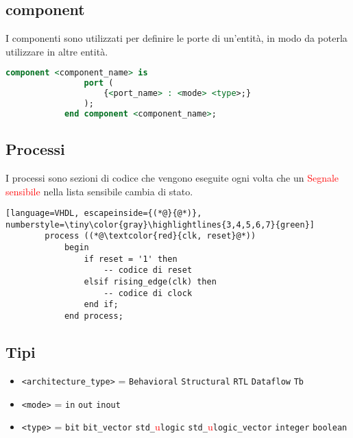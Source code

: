     \subsection{component}
        I componenti sono utilizzati per definire le porte di un'entità, in modo da poterla utilizzare in altre entità.
        \begin{lstlisting}[language=VHDL]
            component <component_name> is
                port (
                    {<port_name> : <mode> <type>;}
                );
            end component <component_name>;
        \end{lstlisting}


    \subsection{Processi}
        I processi sono sezioni di codice che vengono eseguite ogni volta che un \textcolor{red}{Segnale sensibile} nella lista sensibile cambia di stato.
        \begin{lstlisting}[language=VHDL, escapeinside={(*@}{@*)}, numberstyle=\tiny\color{gray}\highlightlines{3,4,5,6,7}{green}]
        process ((*@\textcolor{red}{clk, reset}@*))
            begin
                if reset = '1' then
                    -- codice di reset
                elsif rising_edge(clk) then
                    -- codice di clock
                end if;
            end process;
        \end{lstlisting}


    \subsection{Tipi}
        \begin{itemize}
            \item \texttt{<architecture\_type>} = \texttt{Behavioral} \textbar{} \texttt{Structural} \textbar{} \texttt{RTL} \textbar{} \texttt{Dataflow} \textbar{} \texttt{Tb}
            \item \texttt{<mode>} = \texttt{in} \textbar{} \texttt{out} \textbar{} \texttt{inout}
            \item \texttt{<type>} = \texttt{bit} \textbar{} \texttt{bit\_vector} \textbar{} \texttt{std\_}\textcolor{red}{u}\texttt{logic} \textbar{} \texttt{std\_}\textcolor{red}{u}\texttt{logic\_vector} \textbar{} \texttt{integer} \textbar{} \texttt{boolean}
        \end{itemize}
        


